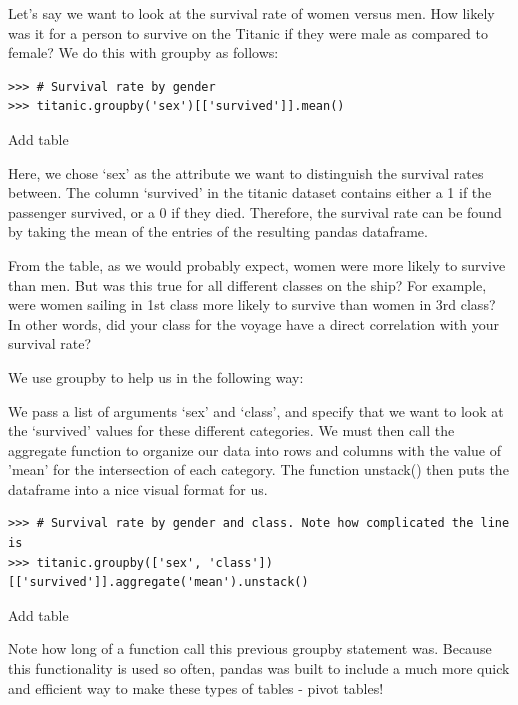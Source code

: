 Let's say we want to look at the survival rate of women versus men. How likely was it for a person to survive on the Titanic if they were male as compared to female? We do this with groupby as follows:

\begin{lstlisting}
>>> # Survival rate by gender
>>> titanic.groupby('sex')[['survived']].mean()
\end{lstlisting}

Add table

Here, we chose `sex' as the attribute we want to distinguish the survival rates between. The column `survived' in the titanic dataset contains either a 1 if the passenger survived, or a 0 if they died. Therefore, the survival rate can be found by taking the mean of the entries of the resulting pandas dataframe.

From the table, as we would probably expect, women were more likely to survive than men. But was this true for all different classes on the ship? For example, were women sailing in 1st class more likely to survive than women in 3rd class? In other words, did your class for the voyage have a direct correlation with your survival rate?

We use groupby to help us in the following way:

We pass a list of arguments `sex' and `class', and specify that we want to look at the `survived' values for these different categories. We must then call the aggregate function to organize our data into rows and columns with the value of 'mean' for the intersection of each category. The function unstack() then puts the dataframe into a nice visual format for us.

\begin{lstlisting}
>>> # Survival rate by gender and class. Note how complicated the line is
>>> titanic.groupby(['sex', 'class'])[['survived']].aggregate('mean').unstack()
\end{lstlisting}

Add table

Note how long of a function call this previous groupby statement was. Because this functionality is used so often, pandas was built to include a much more quick and efficient way to make these types of tables - pivot tables!

